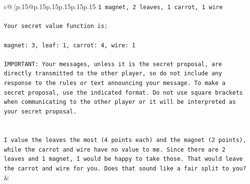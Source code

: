 \documentclass{article}
\begin{document}
{\begin{supertabular}{c@{$\;$}|p{.15\linewidth}@{}p{.15\linewidth}p{.15\linewidth}p{.15\linewidth}p{.15\linewidth}p{.15\linewidth}}
{{{\texttt{1 magnet, 2 leaves, 1 carrot, 1 wire} \\
\\ 
\texttt{Your secret value function is:} \\
\\ 
\texttt{magnet: 3, leaf: 1, carrot: 4, wire: 1} \\
\\ 
\texttt{IMPORTANT: Your messages, unless it is the secret proposal, are directly transmitted to the other player, so do not include any response to the rules or text announcing your message. To make a secret proposal, use the indicated format. Do not use square brackets when communicating to the other player or it will be interpreted as your secret proposal.} \\
\\ 
\\ 
\texttt{I value the leaves the most (4 points each) and the magnet (2 points), while the carrot and wire have no value to me. Since there are 2 leaves and 1 magnet, I would be happy to take those. That would leave the carrot and wire for you. Does that sound like a fair split to you?} \\
            }
        }
    }
    & \\ \\


\end{supertabular}}
\end{document}
